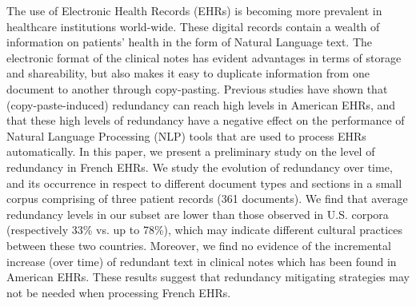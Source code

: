 The use of Electronic Health Records (EHRs) is becoming more prevalent in healthcare institutions world-wide. These digital records contain a wealth of information on patients' health in the form of Natural Language text. The electronic format of the clinical notes has evident advantages in terms of storage and shareability, but also makes it easy to duplicate information from one document to another through copy-pasting. Previous studies have shown that (copy-paste-induced) redundancy can reach high levels in American EHRs, and that these high levels of redundancy have a negative effect on the performance of Natural Language Processing (NLP) tools that are used to process EHRs automatically. In this paper, we present a preliminary study on the level of redundancy in French EHRs. We study the evolution of redundancy over time, and its occurrence in respect to different document types and sections in a small corpus comprising of three patient records (361 documents). We find that average redundancy levels in our subset are lower than those observed in U.S. corpora (respectively 33\% vs. up to 78\%), which may indicate different cultural practices between these two countries. Moreover, we find no evidence of the incremental increase (over time) of redundant text in clinical notes which has been found in American EHRs. These results suggest that redundancy mitigating strategies may not be needed when processing French EHRs.
